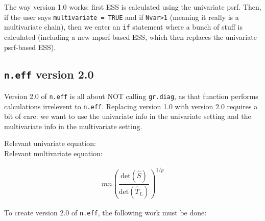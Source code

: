 \documentclass[12pt]{article}
\theoremstyle{remark}
\begin{document}
The way version 1.0 works: first ESS is calculated using the univariate psrf. Then, if the user says \texttt{multivariate = TRUE} and if \texttt{Nvar>1} (meaning it really is a multivariate chain), then we enter an \texttt{if} statement where a bunch of stuff is calculated (including a new mpsrf-based ESS, which then replaces the univariate psrf-based ESS).

\subsection{\texttt{n.eff} version 2.0} %
Version 2.0 of \texttt{n.eff} is all about NOT calling \texttt{gr.diag}, as that function performs calculations irrelevent to \texttt{n.eff}. Replacing version 1.0 with version 2.0 requires a bit of care: we want to use the univariate info in the univariate setting and the multivariate info in the multivariate setting.

Relevant univariate equation: \\

Relevant multivariate equation:

\begin{align*}
m n \left( \dfrac{\text{det}(\hat{S})}{\text{det}(\hat{T}_L)} \right)^{1/p}
\end{align*}

To create version 2.0 of \texttt{n.eff}, the following work must be done:
\end{document}

